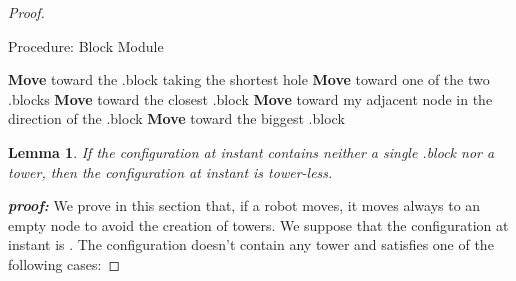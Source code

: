 \documentclass[12pt]{llncs}
\newtheorem{lem}{Lemma}
\begin{document}
\begin{proof}
{\footnotesize
\begin{algorithm}[H]
  \caption{Procedure: Block Module}
  \label{ph1.algo}
 \begin{algorithmic}[1]
          \State \textbf{Move} toward the .block taking the shortest hole
         \EndIf
    \Else
                \State \textbf{Move} toward one of the two .blocks
             \EndIf
         \Else
             \State \textbf{Move} toward the closest .block
          \EndIf
       \EndIf
     \EndIf
\Else {}
            \State \textbf{Move} toward my adjacent node in the direction of the .block
         \EndIf
    \Else
              \State \textbf{Move} toward the biggest .block   
          \EndIf
       \EndIf
     \EndIf
    \EndIf
  \end{algorithmic}
\end{algorithm} 
}
\begin{lem} If the configuration at instant  contains neither a single .block nor a tower, then the configuration at instant  is tower-less.
\end{lem}

\textit{\textbf{proof:}} We prove in this section that, if a robot moves, it moves always to an empty node to avoid the creation of towers. We suppose that the configuration at instant  is . The configuration  doesn't contain any tower and satisfies one of the following cases: 


\end{proof}
\end{document}
